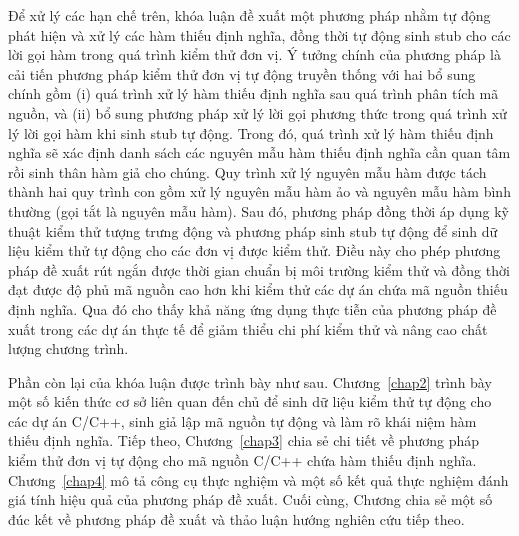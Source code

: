 Để xử lý các hạn chế trên, khóa luận đề xuất một phương pháp nhằm tự động phát hiện và xử lý các hàm thiếu định nghĩa, đồng thời tự động sinh stub cho các lời gọi hàm trong quá trình kiểm thử đơn vị. Ý tưởng chính của phương pháp là cải tiến phương pháp kiểm thử đơn vị tự động truyền thống với hai bổ sung chính gồm (i) quá trình xử lý hàm thiếu định nghĩa sau quá trình phân tích mã nguồn, và (ii) bổ sung phương pháp xử lý lời gọi phương thức trong quá trình xử lý lời gọi hàm khi sinh stub tự động. Trong đó, quá trình xử lý hàm thiếu định nghĩa sẽ xác định danh sách các nguyên mẫu hàm thiếu định nghĩa cần quan tâm rồi sinh thân hàm giả cho chúng. Quy trình xử lý nguyên mẫu hàm được tách thành hai quy trình con gồm xử lý nguyên mẫu hàm ảo và nguyên mẫu hàm bình thường (gọi tắt là nguyên mẫu hàm). Sau đó, phương pháp đồng thời áp dụng kỹ thuật kiểm thử tượng trưng động và phương pháp sinh stub tự động để sinh dữ liệu kiểm thử tự động cho các đơn vị được kiểm thử. Điều này cho phép phương pháp đề xuất rút ngắn được thời gian chuẩn bị môi trường kiểm thử và đồng thời đạt được độ phủ mã nguồn cao hơn khi kiểm thử các dự án chứa mã nguồn thiếu định nghĩa. Qua đó cho thấy khả năng ứng dụng thực tiễn của phương pháp đề xuất trong các dự án thực tế để giảm thiểu chi phí kiểm thử và nâng cao chất lượng chương trình.

Phần còn lại của khóa luận được trình bày như sau. Chương~\ref{chap2} trình bày một số kiến thức cơ sở liên quan đến chủ để sinh dữ liệu kiểm thử tự động cho các dự án C/C++, sinh giả lập mã nguồn tự động và làm rõ khái niệm hàm thiếu định nghĩa. Tiếp theo, Chương~\ref{chap3} chia sẻ chi tiết về phương pháp kiểm thử đơn vị tự động cho mã nguồn C/C++ chứa hàm thiếu định nghĩa. Chương~\ref{chap4} mô tả công cụ thực nghiệm và một số kết quả thực nghiệm đánh giá tính hiệu quả của phương pháp đề xuất. Cuối cùng, Chương  chia sẻ một số đúc kết về phương pháp đề xuất và thảo luận hướng nghiên cứu tiếp theo.